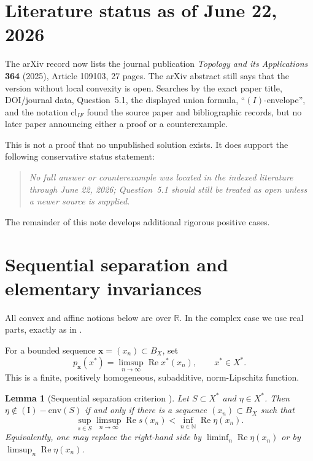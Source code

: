 \documentclass[11pt]{article}
\newtheorem{lemma}[theorem]{Lemma}
\theoremstyle{remark}
\newcommand{\Ienv}{\operatorname{(I)\!\!-env}}
\newcommand{\Ree}{\operatorname{Re}}
\newcommand{\R}{\mathbb{R}}
\newcommand{\N}{\mathbb{N}}
\begin{document}
\section{Literature status as of June 22, 2026}

The arXiv record now lists the journal publication
\emph{Topology and its Applications} \textbf{364} (2025), Article 109103,
27 pages.  The arXiv abstract still says that the version without local
convexity is open.  Searches by the exact paper title, DOI/journal data,
Question~5.1, the displayed union formula, ``$(I)$-envelope'', and the
notation $\mathrm{cl}_{IF}$ found the source paper and bibliographic records,
but no later paper announcing either a proof or a counterexample.

This is not a proof that no unpublished solution exists.  It does support
the following conservative status statement:

\begin{quote}
\emph{No full answer or counterexample was located in the indexed literature
through June 22, 2026; Question~5.1 should still be treated as open unless a
newer source is supplied.}
\end{quote}

The remainder of this note develops additional rigorous positive cases.

\section{Sequential separation and elementary invariances}

All convex and affine notions below are over $\R$.  In the complex case we
use real parts, exactly as in \cite[Lemma~2.1]{KR}.

For a bounded sequence $\mathbf{x}=(x_n)\subset B_X$, set
\[
 p_{\mathbf{x}}(x^*)=\limsup_{n\to\infty}\Ree x^*(x_n),
 \qquad x^*\in X^*.
\]
This is a finite, positively homogeneous, subadditive, norm-Lipschitz
function.

\begin{lemma}[Sequential separation criterion \cite{Kalenda2007,KR}]
\label{lem:separation}
Let $S\subset X^*$ and $\eta\in X^*$.  Then $\eta\notin\Ienv(S)$ if and
only if there is a sequence $(x_n)\subset B_X$ such that
\[
\tag{3.1}\label{strongsep}
 \sup_{s\in S}\limsup_{n\to\infty}\Ree s(x_n)
 <\inf_{n\in\N}\Ree\eta(x_n).
\]
Equivalently, one may replace the right-hand side by
$\liminf_n\Ree\eta(x_n)$ or by $\limsup_n\Ree\eta(x_n)$.
\end{lemma}
\end{document}
